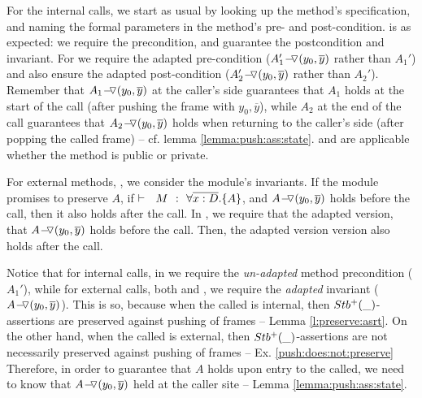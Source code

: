 For the internal calls, we  start as usual by looking up the method's specification, and 
naming the formal   parameters in the method's pre- and post-condition.
  {} is as expected:   we  require the precondition, and guarantee the postcondition and invariant.
For {} we require the adapted pre-condition ($  \PushASLong {(y_0, \overline y)}{A_1'}$  rather than $A_1'$) and also ensure the adapted post-condition ($ \PushASLong {(y_0, \overline y)}{A_2'}$  rather than $A_2'$).
Remember that $ \PushASLong {(y_0, \overline y)}{A_1}$ at the caller's side guarantees that $A_1$ holds at the start of the call  (after pushing the frame with   $y_0, \overline y$), while  
$A_2$ at the end of the call  guarantees that  $ \PushASLong {(y_0, \overline y)}{A_2}$  holds when returning to the caller's side  (after popping the called frame)
-- cf.  lemma \ref{lemma:push:ass:state}.
 {} and {}  are applicable whether the method is public or private.


For external methods,  {}, we consider the module's invariants. If the module promises to preserve $A$, \ie if  $\promises M   {\TwoStatesN {\overline {x:D}} {A}}$, and   $ \PushASLong {(y_0, \overline y)}{A}$  holds before the call, then it also holds after  the call.
In  {},  we require that the adapted version,  \ie that   $ \PushASLong {(y_0, \overline y)}{A}$ holds before the call. Then, the 
adapted version version also holds after the call. 


\vspace{.1cm}

Notice that %
 for internal calls, in {} we require  the \emph{un-adapted} %
 method  precondition (\ie $A_1'$), while for external calls, both {} and {}, we require the 
 \emph{adapted} %
 invariant (\ie $ \PushASLong {(y_0, \overline y)}{A}$). 
This is so, because when the called is internal, then  %
 $\Pos{\_}$-assertions are preserved against pushing of frames -- \cf Lemma \ref{l:preserve:asrt}. 
On the other hand, when the called is external, then $\Pos{\_}$-assertions are not necessarily preserved against pushing of frames -- \cf Ex. \ref{push:does:not:preserve} 
Therefore, in order to guarantee that $A$ holds upon entry to the called, we need to know that $ \PushASLong {(y_0, \overline y)}{A}$ held at the caller site -- \cf Lemma \ref{lemma:push:ass:state}.

